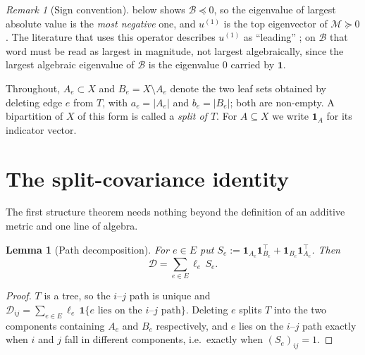\documentclass[11pt]{article}
\theoremstyle{plain}
\newtheorem{lemma}{Lemma}
\theoremstyle{definition}
\theoremstyle{remark}
\newtheorem{remark}{Remark}
\providecommand{\Dmat}{\mathcal{D}}          %
\providecommand{\Bop}{\mathcal{B}}           %
\providecommand{\Mop}{\mathcal{M}}           %
\providecommand{\uone}{u^{(1)}}
\providecommand{\1}{\mathbf{1}}
\begin{document}
\begin{remark}[Sign convention]\label{d:rem:sign}
 below shows $\Bop\preceq0$, so the eigenvalue of largest
absolute value is the \emph{most negative} one, and $\uone$ is the top
eigenvector of $\Mop\succeq0$. The literature that uses this operator describes
$\uone$ as ``leading'' \cite{aizenbud2023spectral}; on $\Bop$ that word must be
read as largest in magnitude, not largest algebraically, since the largest
algebraic eigenvalue of $\Bop$ is the eigenvalue $0$ carried by $\1$.
\end{remark}

Throughout, $A_e\subset X$ and $B_e=X\setminus A_e$ denote the two leaf sets
obtained by deleting edge $e$ from $T$, with $a_e=|A_e|$ and $b_e=|B_e|$; both
are non-empty. A bipartition of $X$ of this form is called a \emph{split of
$T$}. For $A\subseteq X$ we write $\1_A$ for its indicator vector.

\section{The split-covariance identity}\label{d:sec:structure}

The first structure theorem needs nothing beyond the definition of an additive
metric and one line of algebra.

\begin{lemma}[Path decomposition]\label{d:lem:path}
For $e\in E$ put $S_e:=\1_{A_e}\1_{B_e}^\top+\1_{B_e}\1_{A_e}^\top$. Then
\begin{equation}\label{d:eq:path}
  \Dmat=\sum_{e\in E}\ell_e\,S_e .
\end{equation}
\end{lemma}

\begin{proof}
$T$ is a tree, so the $i$--$j$ path is unique and
$\Dmat_{ij}=\sum_{e\in E}\ell_e\,\mathbf{1}\{e\text{ lies on the }i\text{--}j
\text{ path}\}$. Deleting $e$ splits $T$ into the two components containing
$A_e$ and $B_e$ respectively, and $e$ lies on the $i$--$j$ path exactly when $i$
and $j$ fall in different components, i.e.\ exactly when $(S_e)_{ij}=1$.
\end{proof}
\end{document}
